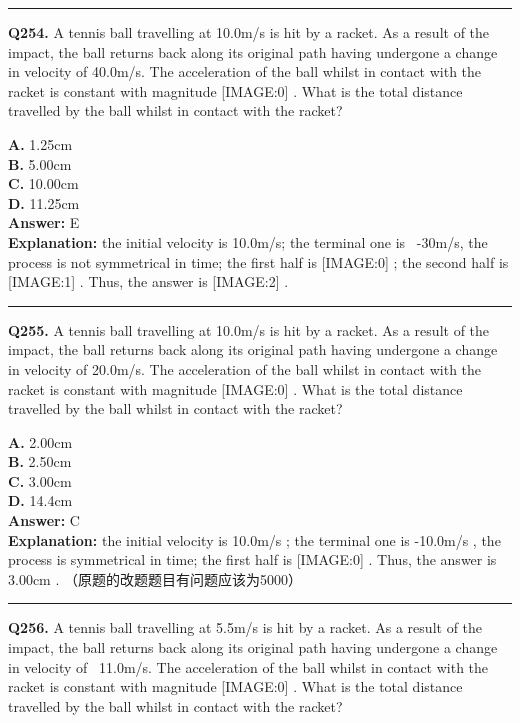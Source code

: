 \documentclass[12pt]{article}
\begin{document}
\hrule
\vspace{1em}


\noindent
\textbf{Q254.} A tennis ball travelling at 10.0m/s is hit by a racket. As a result of the impact, the ball returns back along its original path having undergone a change in velocity of 40.0m/s. The acceleration of the ball whilst in contact with the racket is constant with magnitude
[IMAGE:0]
.
What is the total distance travelled by the ball whilst in contact with the racket?



\textbf{A.} 1.25cm \\
\textbf{B.} 5.00cm \\
\textbf{C.} 10.00cm \\
\textbf{D.} 11.25cm \\

\textbf{Answer:} E \\
\textbf{Explanation:} the initial velocity is 10.0m/s; the terminal one is  -30m/s, the process is not symmetrical in time; the first half is
[IMAGE:0]
; the second half is
[IMAGE:1]
. Thus, the answer is
[IMAGE:2]
.

\hrule
\vspace{1em}


\noindent
\textbf{Q255.} A tennis ball travelling at 10.0m/s is hit by a racket. As a result of the impact, the ball returns back along its original path having undergone a change in velocity of 20.0m/s. The acceleration of the ball whilst in contact with the racket is constant with magnitude
[IMAGE:0]
.
What is the total distance travelled by the ball whilst in contact with the racket?



\textbf{A.} 2.00cm \\
\textbf{B.} 2.50cm \\
\textbf{C.} 3.00cm \\
\textbf{D.} 14.4cm \\

\textbf{Answer:} C \\
\textbf{Explanation:} the initial velocity is 10.0m/s
; the terminal one is -10.0m/s
, the process is symmetrical in time; the first half is
[IMAGE:0]
. Thus, the answer is 3.00cm
.
（原题的改题题目有问题应该为5000）

\hrule
\vspace{1em}


\noindent
\textbf{Q256.} A tennis ball travelling at 5.5m/s is hit by a racket. As a result of the impact, the ball returns back along its original path having undergone a change in velocity of  11.0m/s. The acceleration of the ball whilst in contact with the racket is constant with magnitude
[IMAGE:0]
.
What is the total distance travelled by the ball whilst in contact with the racket?
\end{document}
